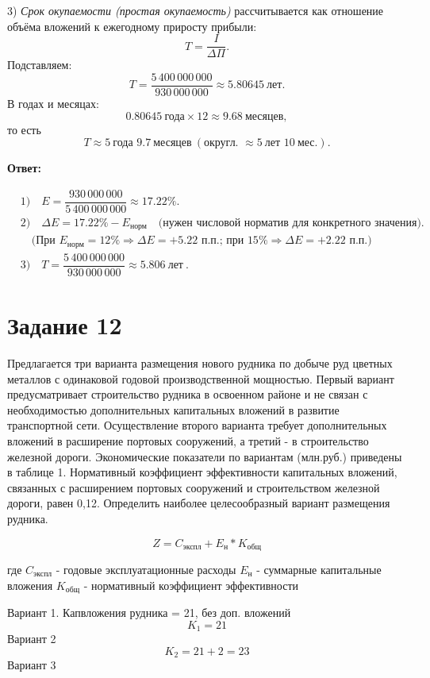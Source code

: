 \documentclass[14pt,a4paper]{extarticle}
\begin{document}
3) \textit{Срок окупаемости (простая окупаемость)} рассчитывается как отношение объёма вложений к ежегодному приросту прибыли:
\[
T = \frac{I}{\Delta\Pi}.
\]
Подставляем:
\[
T = \frac{5\,400\,000\,000}{930\,000\,000} \approx 5.80645\ \text{лет}.
\]
В годах и месяцах:
\[
0.80645\ \text{года} \times 12 \approx 9.68\ \text{месяцев},
\]
то есть
\[
T \approx 5\ \text{года } 9.7\ \text{месяцев} \ (\text{округл. } \approx 5\ \text{лет }10\ \text{мес.}).
\]

\textbf{Ответ:}

\[
\begin{aligned}
&1)\quad E = \dfrac{930\,000\,000}{5\,400\,000\,000} \approx 17.22\%.\\[6pt]
&2)\quad \Delta E = 17.22\% - E_{\text{норм}}\quad\text{(нужен числовой норматив для конкретного значения)}.\\[6pt]
    &\quad\text{(При }E_{\text{норм}}=12\%\Rightarrow\Delta E=+5.22\text{ п.п.; при }15\%\Rightarrow\Delta E=+2.22\text{ п.п.})\\[6pt]
&3)\quad T=\dfrac{5\,400\,000\,000}{930\,000\,000}\approx 5.806\ \text{лет}\ .
\end{aligned}
\]

\section{Задание 12}

Предлагается три варианта размещения нового рудника по добыче руд цветных
металлов с одинаковой годовой производственной мощностью. Первый вариант
предусматривает строительство рудника в освоенном районе и не связан с
необходимостью дополнительных капитальных вложений в развитие транспортной сети.
Осуществление второго варианта требует дополнительных вложений в расширение
портовых сооружений, а третий - в строительство железной дороги. Экономические
показатели по вариантам (млн.руб.) приведены в таблице 1. Нормативный коэффициент
эффективности капитальных вложений, связанных с расширением портовых сооружений и
строительством железной дороги, равен 0,12.
Определить наиболее целесообразный вариант размещения рудника.

\[
    Z = C_{\text{экспл}} + E_\text{н} * K_\text{{общ}}
\]

где $C_{\text{экспл}}$ - годовые эксплуатационные расходы
$E_\text{н}$ - суммарные капитальные вложения
$K_\text{общ}$ - нормативный коэффициент эффективности

Вариант 1.
Капвложения рудника = 21, без доп. вложений
\[
K_1 = 21
\]
Вариант 2
\[
K_2 = 21 + 2 = 23
\]
Вариант 3
\end{document}

